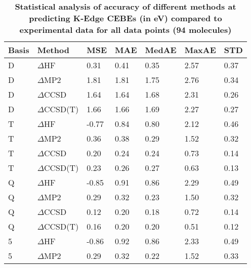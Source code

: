 \begin{table}
  \caption{\textbf{Statistical analysis of accuracy of different methods at predicting K-Edge CEBEs (in eV) compared to experimental data for all data points (94 molecules)}}
  \label{tbl:method-all-summary}
  \begin{tabular}{l l l l l l l }
    \toprule
    \textbf{Basis} & \textbf{Method} & \textbf{MSE} & \textbf{MAE} & \textbf{MedAE} & \textbf{MaxAE} & \textbf{STD} \\ 
    \midrule
    D & $\Delta$HF & 0.31 & 0.41 & 0.35 & 2.57 & 0.37 \\ 
    D & $\Delta$MP2 & 1.81 & 1.81 & 1.75 & 2.76 & 0.34 \\ 
    D & $\Delta$CCSD & 1.64 & 1.64 & 1.68 & 2.31 & 0.26 \\ 
    D & $\Delta$CCSD(T) & 1.66 & 1.66 & 1.69 & 2.27 & 0.27 \\ 
    T & $\Delta$HF & -0.77 & 0.84 & 0.80 & 2.12 & 0.46 \\ 
    T & $\Delta$MP2 & 0.36 & 0.38 & 0.29 & 1.52 & 0.32 \\ 
    T & $\Delta$CCSD & 0.20 & 0.24 & 0.24 & 0.73 & 0.14 \\ 
    T & $\Delta$CCSD(T) & 0.23 & 0.26 & 0.27 & 0.63 & 0.13 \\ 
    Q & $\Delta$HF & -0.85 & 0.91 & 0.86 & 2.29 & 0.49 \\ 
    Q & $\Delta$MP2 & 0.29 & 0.32 & 0.23 & 1.50 & 0.32 \\ 
    Q & $\Delta$CCSD & 0.12 & 0.20 & 0.18 & 0.72 & 0.14 \\ 
    Q & $\Delta$CCSD(T) & 0.16 & 0.20 & 0.20 & 0.51 & 0.12 \\ 
    5 & $\Delta$HF & -0.86 & 0.92 & 0.86 & 2.33 & 0.49 \\ 
    5 & $\Delta$MP2 & 0.29 & 0.32 & 0.22 & 1.52 & 0.33 \\ 
    \bottomrule
  \end{tabular}
\end{table}
